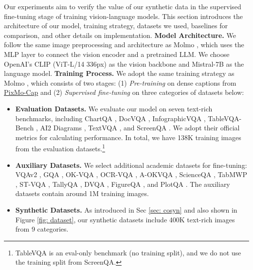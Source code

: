 
Our experiments aim to verify the value of our synthetic data in the supervised fine-tuning stage of training vision-language models.
This section introduces the architecture of our model, training strategy, datasets we used, baselines for comparison, and other details on implementation.
\smallbreak
\noindent \textbf{Model Architecture.} We follow the same image preprocessing and architecture as Molmo \cite{deitke2024molmo}, which uses the MLP layer to connect the vision encoder and a pretrained LLM. We choose OpenAI’s CLIP (ViT-L/14 336px) \cite{clip} as the vision backbone and Mistral-7B \cite{jiang2023mistral} as the language model.
\smallbreak
\noindent \textbf{Training Process.} We adopt the same training strategy as Molmo \cite{deitke2024molmo}, which consists of two stages: (1) \textit{Pre-training} on dense captions from \href{https://huggingface.co/datasets/allenai/pixmo-cap}{PixMo-Cap} and (2) \textit{Supervised fine-tuning} on three categories of datasets below:

\begin{itemize}[noitemsep, topsep=0pt, leftmargin=*]
    \item \textbf{Evaluation Datasets.} We evaluate our model on seven text-rich benchmarks, including ChartQA \cite{masry-etal-2022-chartqa}, DocVQA \cite{mathew2021docvqa}, InfographicVQA \cite{mathew2022infographicvqa}, TableVQA-Bench \cite{kim2024tablevqa}, AI2 Diagrams \cite{kembhavi2016diagram}, TextVQA \cite{singh2019towards}, and ScreenQA \cite{baechler2024screenai}. We adopt their official metrics for calculating performance. In total, we have 138K training images from the evaluation datasets.\footnote{TableVQA is an eval-only benchmark (no training split), and we do not use the training split from ScreenQA.}

    \item \textbf{Auxiliary Datasets.} We select additional academic datasets for fine-tuning: VQAv2 \cite{balanced_vqa_v2}, GQA \cite{hudson2019gqa}, OK-VQA \cite{okvqa}, OCR-VQA \cite{mishraICDAR19}, A-OKVQA \cite{schwenk2022okvqa}, ScienceQA \cite{lu2022learn}, TabMWP \cite{lu2023dynamic}, ST-VQA \cite{biten2019scene}, TallyQA \cite{acharya2019tallyqa}, DVQA \cite{kafle2018dvqa}, FigureQA \cite{kahou2017figureqa}, and PlotQA \cite{methani2020plotqa}. The auxiliary datasets contain around 1M training images.

    \item \textbf{Synthetic Datasets.} As introduced in Sec \ref{sec: cosyn} and also shown in Figure \ref{fig: dataset}, our synthetic datasets include 400K text-rich images from 9 categories.
\end{itemize}


